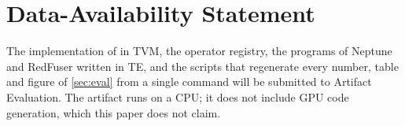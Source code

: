 \section*{Data-Availability Statement}
The implementation of \sys in TVM, the operator registry, the programs of Neptune and RedFuser written in TE, and the scripts that regenerate every number, table and figure of \cref{sec:eval} from a single command will be submitted to Artifact Evaluation.
The artifact runs on a CPU; it does not include GPU code generation, which this paper does not claim.
